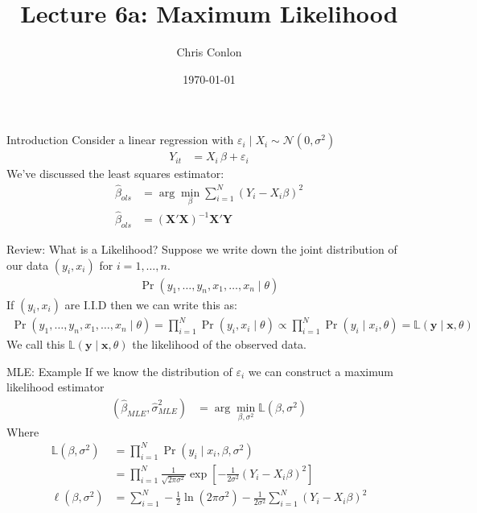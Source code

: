 \documentclass[aspectratio=169,11pt]{beamer}
\title{Lecture 6a: Maximum Likelihood}
\author{Chris Conlon }
\institute{NYU Stern }
\date{\today}
\begin{document}
\maketitle

\begin{frame}{Introduction}
Consider a linear regression with $\varepsilon_i \mid X_i \sim \mathcal{N}(0,\sigma^2)$
\begin{align*}
Y_{it} &= X_{i}\, \beta + \varepsilon_{i}
\end{align*}
We've discussed the \alert{least squares estimator}:
\begin{align*}
\widehat{\beta}_{ols} &= \arg \min_{\beta} \sum_{i=1}^N (Y_i - X_i \beta)^2\\
\widehat{\beta}_{ols} &= (\mathbf{X}'\mathbf{X})^{-1} \mathbf{X}' \mathbf{Y}
\end{align*}
\end{frame}


\begin{frame}{Review: What is a Likelihood?}
Suppose we write down the joint distribution of our data $(y_i,x_i)$ for $i=1,\ldots,n$.
\begin{align*}
\Pr(y_1,\ldots,y_n, x_1,\ldots,x_n \mid  \theta)
\end{align*}
If  $(y_i,x_i)$ are I.I.D then we can write this as:
\begin{align*}
 \Pr(y_1,\ldots,y_n, x_1,\ldots,x_n \mid \theta) = \prod_{i=1}^N \Pr(y_i, x_i \mid \theta) \propto \prod_{i=1}^N \Pr(y_i \mid x_i , \theta)=\mathbb{L}( \mathbf{y} \mid \mathbf{x} ,\theta )
\end{align*}
We call this $\mathbb{L}( \mathbf{y}\mid \mathbf{x} ,\theta )$ the \alert{likelihood} of the observed data.
\end{frame}




\begin{frame}{MLE: Example}
If we know the distribution of $\varepsilon_i$ we can construct a \alert{maximum likelihood estimator}
\begin{align*}
(\widehat{\beta}_{MLE},\widehat{\sigma}^2_{MLE}) &= \arg \min_{\beta,\sigma^2} \mathbb{L}(\beta,\sigma^2)
\end{align*}
Where 
\begin{align*} 
\mathbb{L}(\beta,\sigma^2) &= \prod_{i=1}^N \Pr(y_i \mid x_i,\beta,\sigma^2) \\
                  &= \prod_{i=1}^N \frac{1}{\sqrt{2 \pi \sigma^2}} \exp \left[-\frac{1}{2\sigma^2}(Y_i - X_i \beta)^2 \right]\\
\ell(\beta,\sigma^2) &= \sum_{i=1}^N -\frac{1}{2} \ln (2 \pi \sigma^2) - \frac{1}{2 \sigma^2} \sum_{i=1}^N(Y_i - X_i \beta)^2
\end{align*}
\end{frame}
\end{document}
